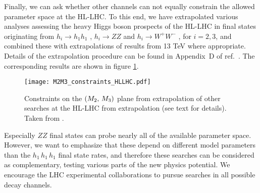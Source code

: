 Finally, we can ask whether other channels can not equally constrain the allowed parameter space at the HL-LHC. To this end, we have extrapolated various analyses assessing the heavy Higgs boson prospects of the HL-LHC in final states originating from $h_i \rightarrow h_1 h_1$ \cite{Sirunyan:2018two,Aad:2019uzh}, $h_i \rightarrow ZZ$ \cite{Sirunyan:2018qlb,Cepeda:2019klc} and $h_i \rightarrow W^+W^-$ \cite{Aaboud:2017gsl,ATL-PHYS-PUB-2018-022}, for $i=2,3$, and combined these with extrapolations of results from 13 TeV where appropriate. Details of the extrapolation procedure can be found in Appendix~D of ref.~\cite{Papaefstathiou:2020iag}. The corresponding results are shown in figure \ref{fig:hlothers}.

\begin{center}
\begin{figure}[htb]
\begin{center}%
\texttt{[image: M2M3\_constraints\_HLLHC.pdf]}
\end{center}
\caption{Constraints on the $\left( M_2,\,M_3 \right)$ plane from extrapolation of other searches at the HL-LHC from extrapolation (see text for details). Taken from \cite{Papaefstathiou:2020lyp}.}
\label{fig:hlothers}
\end{figure}
\end{center}

Especially $ZZ$ final states can probe nearly all of the available parameter space. However, we want to emphasize that these depend on different model parameters than the $h_1\,h_1\,h_1$ final state rates, and therefore these searches can be considered as complementary, testing various parts of the new physics potential. We encourage the LHC experimental collaborations to pursue searches in all possible decay channels.
